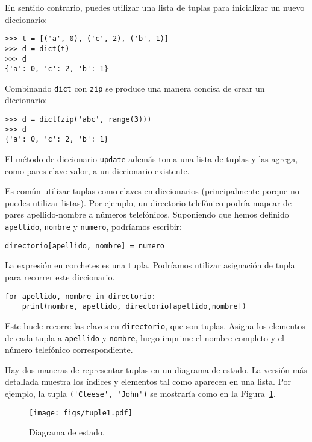 \documentclass[10pt]{book}
\begin{document}
En sentido contrario, puedes utilizar una lista de tuplas para
inicializar un nuevo diccionario: 

\begin{verbatim}
>>> t = [('a', 0), ('c', 2), ('b', 1)]
>>> d = dict(t)
>>> d
{'a': 0, 'c': 2, 'b': 1}
\end{verbatim}

Combinando {\tt dict} con {\tt zip} se produce una manera concisa
de crear un diccionario:

\begin{verbatim}
>>> d = dict(zip('abc', range(3)))
>>> d
{'a': 0, 'c': 2, 'b': 1}
\end{verbatim}
%
El método de diccionario {\tt update} además toma una lista de tuplas
y las agrega, como pares clave-valor, a un diccionario existente.

Es común utilizar tuplas como claves en diccionarios (principalmente porque
no puedes utilizar listas).  Por ejemplo, un directorio telefónico podría mapear
de pares apellido-nombre a números telefónicos.  Suponiendo
que hemos definido {\tt apellido}, {\tt nombre} y {\tt numero},
podríamos escribir:

\begin{verbatim}
directorio[apellido, nombre] = numero
\end{verbatim}
%
La expresión en corchetes es una tupla.  Podríamos utilizar asignación
de tupla para recorrer este diccionario.

\begin{verbatim}
for apellido, nombre in directorio:
    print(nombre, apellido, directorio[apellido,nombre])
\end{verbatim}
%
Este bucle recorre las claves en {\tt directorio}, que son tuplas.  Asigna
los elementos de cada tupla a {\tt apellido} y {\tt nombre}, luego
imprime el nombre completo y el número telefónico correspondiente.

Hay dos maneras de representar tuplas en un diagrama de estado.  La versión
más detallada muestra los índices y elementos tal como aparecen en
una lista.  Por ejemplo, la tupla \verb"('Cleese', 'John')" se mostraría
como en la Figura~\ref{fig.tuple1}.

\begin{figure}
\centerline
{\texttt{[image: figs/tuple1.pdf]}}
\caption{Diagrama de estado.}
\label{fig.tuple1}
\end{figure}
\end{document}
